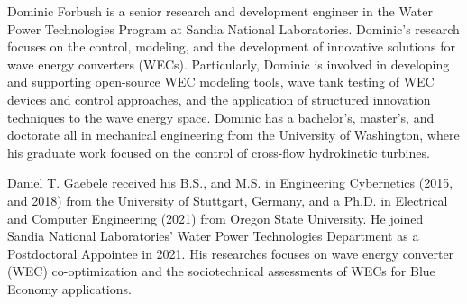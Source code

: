 \documentclass[lettersize,journal]{IEEEtran}
\begin{document}
\begin{IEEEbiography}{Dominic Forbush}
is a senior research and development engineer in the Water Power Technologies Program at Sandia National Laboratories.
Dominic's research focuses on the control, modeling, and the development of innovative solutions for wave energy converters (WECs).
Particularly, Dominic is involved in developing and supporting open-source WEC modeling tools, wave tank testing of WEC devices and control approaches, and the application of structured innovation techniques to the wave energy space.
Dominic has a bachelor's, master's, and doctorate all in mechanical engineering from the University of Washington, where his graduate work focused on the control of cross-flow hydrokinetic turbines.
\end{IEEEbiography}

\begin{IEEEbiography}{Daniel T. Gaebele}
received his B.S., and M.S. in Engineering Cybernetics (2015, and 2018) from the University of Stuttgart, Germany, and a Ph.D. in Electrical and Computer Engineering (2021) from Oregon State University.
He joined Sandia National Laboratories' Water Power Technologies Department as a Postdoctoral Appointee in 2021.
His researches focuses on wave energy converter (WEC) co-optimization and the sociotechnical assessments of WECs for Blue Economy applications.
\end{IEEEbiography}
\end{document}
